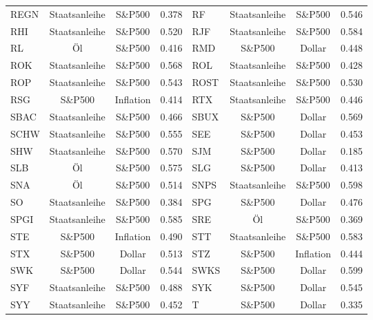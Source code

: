 \begin{longtable}{l c c c | l c c c}
    REGN   & Staatsanleihe & S\&P500   & 0.378         & RF     & Staatsanleihe & S\&P500   & 0.546         \\
    RHI    & Staatsanleihe & S\&P500   & 0.520         & RJF    & Staatsanleihe & S\&P500   & 0.584         \\
    RL     & Öl            & S\&P500   & 0.416         & RMD    & S\&P500       & Dollar    & 0.448         \\
    ROK    & Staatsanleihe & S\&P500   & 0.568         & ROL    & Staatsanleihe & S\&P500   & 0.428         \\
    ROP    & Staatsanleihe & S\&P500   & 0.543         & ROST   & Staatsanleihe & S\&P500   & 0.530         \\
    RSG    & S\&P500       & Inflation & 0.414         & RTX    & Staatsanleihe & S\&P500   & 0.446         \\
    SBAC   & Staatsanleihe & S\&P500   & 0.466         & SBUX   & S\&P500       & Dollar    & 0.569         \\
    SCHW   & Staatsanleihe & S\&P500   & 0.555         & SEE    & S\&P500       & Dollar    & 0.453         \\
    SHW    & Staatsanleihe & S\&P500   & 0.570         & SJM    & S\&P500       & Dollar    & 0.185         \\
    SLB    & Öl            & S\&P500   & 0.575         & SLG    & S\&P500       & Dollar    & 0.413         \\
    SNA    & Öl            & S\&P500   & 0.514         & SNPS   & Staatsanleihe & S\&P500   & 0.598         \\
    SO     & Staatsanleihe & S\&P500   & 0.384         & SPG    & S\&P500       & Dollar    & 0.476         \\
    SPGI   & Staatsanleihe & S\&P500   & 0.585         & SRE    & Öl            & S\&P500   & 0.369         \\
    STE    & S\&P500       & Inflation & 0.490         & STT    & Staatsanleihe & S\&P500   & 0.583         \\
    STX    & S\&P500       & Dollar    & 0.513         & STZ    & S\&P500       & Inflation & 0.444         \\
    SWK    & S\&P500       & Dollar    & 0.544         & SWKS   & S\&P500       & Dollar    & 0.599         \\
    SYF    & Staatsanleihe & S\&P500   & 0.488         & SYK    & S\&P500       & Dollar    & 0.545         \\
    SYY    & Staatsanleihe & S\&P500   & 0.452         & T      & S\&P500       & Dollar    & 0.335         \\

\end{longtable}
